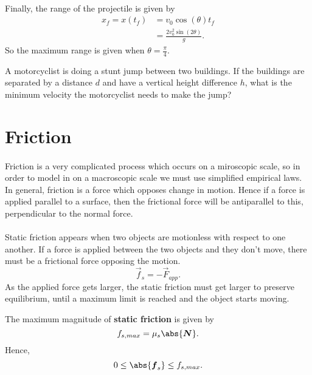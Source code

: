 \documentclass[../classical_mechanics.tex]{subfiles}
\begin{document}
        \paragraph{}
        Finally, the range of the projectile is given by
        \begin{align}
            x_f = x(t_f) &= v_0\cos(\theta)t_f\\
            &= \frac{2v_0^2\sin(2\theta)}{g}.
        \end{align}
        So the maximum range is given when $\theta=\frac{\pi}{4}$.


        \begin{example}
            A motorcyclist is doing a stunt jump between two buildings.
            If the buildings are separated by a distance $d$ and have a vertical height difference $h$, what is the minimum velocity the motorcyclist needs to make the jump?
        \end{example}

    \section{Friction}\label{sec:friction}
        \paragraph{}
        Friction is a very complicated process which occurs on a miroscopic scale, so in order to model in on a macroscopic scale we must use simplified empirical laws.
        In general, friction is a force which opposes change in motion. Hence if a force is applied parallel to a surface, then the frictional force will be antiparallel to this, perpendicular to the normal force.

        \paragraph{}
        Static friction appears when two objects are motionless with respect to one another.
        If a force is applied between the two objects and they don't move, there must be a frictional force opposing the motion.
        \begin{equation}
            \vec{f}_s=-\vec{F}_{app}.
        \end{equation}
        As the applied force gets larger, the static friction must get larger to preserve equilibrium, until a maximum limit is reached and the object starts moving.
        \begin{definition}
            The maximum magnitude of \textbf{static friction} is given by
            \begin{equation}
                f_{s,max}=\mu_s\abs{\vec{N}}.
            \end{equation}
            Hence,
            \begin{equation}
                0\leq\abs{\vec{f}_s}\leq f_{s,max}.
            \end{equation}
        \end{definition}
\end{document}
